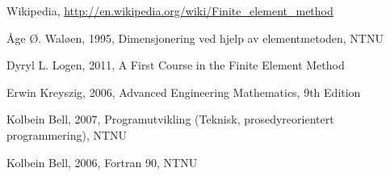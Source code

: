 \documentclass[10pt,a4paper, norsk]{article}
\begin{document}
\begin{thebibliography}{9}

  Wikipedia,
  \url{http://en.wikipedia.org/wiki/Finite_element_method}
  

  Åge Ø. Waløen,
  1995, 
  Dimensjonering ved hjelp av elementmetoden, NTNU
 
	Dyryl L. Logen, 2011, A First Course in the Finite Element Method
	
Erwin Kreyszig, 2006, Advanced Engineering Mathematics, 9th Edition

Kolbein Bell, 2007, Programutvikling (Teknisk, prosedyreorientert programmering), NTNU

Kolbein Bell, 2006, Fortran 90, NTNU

\end{thebibliography}
\end{document}
